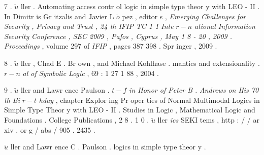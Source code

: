 \documentclass[10pt]{article}
\begin{document}
{\small 7 . }   $ \ddot{u} $  {\small ller . Automating access contr ol logic in simple type theor y with } 
 {\small LEO - II . In Dimitr is Gr itzalis and Javier L }  $ \acute{o} $  {\small pez , editor s , \textit{Emerging Challenges for } } 
 {\small \textit{Security , Privacy and Trust , 24 th IFIP TC 1 1 Inte } }  $ r-n $  {\small \textit{ational Information Security } } 
 {\small \textit{Conference , SEC 2009 , Pafos , Cyprus , May 1 8 - 20 , 2009 . Proceedings } , volume 297 } 
 {\small of \textit{IFIP } , pages 387 398 . Spr inger , 2009 . } 


\newpage
{\small 8 . }   $ \ddot{u} $  {\small ller , Chad E . Br own , and Michael Kohlhase . }  
 {\small mantics and extensionality . }   $ r-n $  {\small \textit{al of Symbolic Logic } , 69 : 1 27 1 88 , 2004 . } 

{\small 9 . }   $ \ddot{u} $  {\small ller and Lawr ence Paulson . }   $ t-f $  {\small \textit{in Honor of Peter B . } } 
 {\small \textit{Andrews on His 70 th Bi } }  $ r-t $  {\small \textit{hday } , chapter Explor ing Pr oper ties of Normal Multimodal } 
 {\small Logics in Simple Type Theor y with LEO - II . Studies in Logic , Mathematical Logic } 
 {\small and Foundations . College Publications , 2 8 . } 
 {\small 1 0 . }   $ \ddot{u} $  {\small ller }    
 {\small \textit{ics } }          
 {\small SEKI }          
 {\small tems , }         
 {\small http : / / ar xiv . or g / abs / 905 . 2435 . } 

   $ \ddot{u} $  {\small ller and Lawr ence C . Paulson . }  
 {\small logics in simple type theor y . }  
\end{document}

